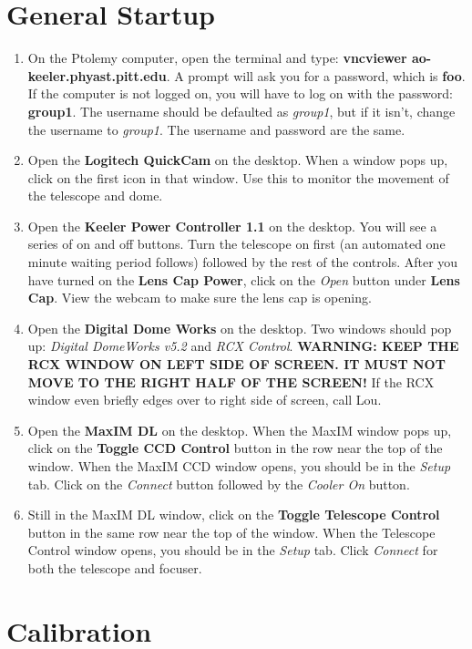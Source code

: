 \documentclass[11pt]{report}
\begin{document}
\section{General Startup} 

\begin{enumerate}
\item On the Ptolemy computer, open the terminal and type: {\bf vncviewer ao-keeler.phyast.pitt.edu}. A prompt will ask you for a password, which is {\bf foo}. If the computer is not logged on, you will have to log on with the password: {\bf group1}. The username should be defaulted as \emph{group1}, but if it isn't, change the username to \emph{group1}. The username and password are the same. 
\item Open the {\bf Logitech QuickCam} on the desktop. When a window pops up, click on the first icon in that window. Use this to monitor the movement of the telescope and dome.
\item Open the {\bf Keeler Power Controller 1.1} on the desktop. You will see a series of on and off buttons. Turn the telescope on first (an automated one minute waiting period follows) followed by the rest of the controls. After you have turned on the {\bf Lens Cap Power}, click on the \emph{Open} button under {\bf Lens Cap}. View the webcam to make sure the lens cap is opening. 
\item Open the {\bf Digital Dome Works} on the desktop. Two windows should pop up: \emph{Digital DomeWorks v5.2} and \emph{RCX Control}. {\bf WARNING: KEEP THE RCX WINDOW ON LEFT SIDE OF SCREEN. IT MUST NOT MOVE TO THE RIGHT HALF OF THE SCREEN!} If the RCX window even briefly edges over to right side of screen, call Lou. 
\item Open the {\bf MaxIM DL} on the desktop. When the MaxIM window pops up, click on the {\bf Toggle CCD Control} button in the row near the top of the window. When the MaxIM CCD window opens, you should be in the \emph{Setup} tab. Click on the \emph{Connect} button followed by the \emph{Cooler On} button. 
\item Still in the MaxIM DL window, click on the {\bf Toggle Telescope Control} button in the same row near the top of the window. When the Telescope Control window opens, you should be in the \emph{Setup} tab. Click \emph{Connect} for both the telescope and focuser.
\end{enumerate}

\section{Calibration}
\end{document}
